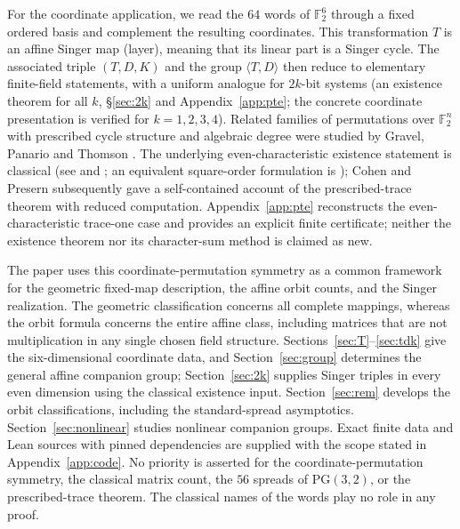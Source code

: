 \documentclass[11pt]{article}
\begin{document}
For the coordinate application, we read the $64$ words of $\mathbb{F}_2^6$
through a fixed ordered basis and complement the resulting coordinates.
This transformation $T$ is an affine Singer map (layer), meaning that its
linear part is a Singer cycle. The
associated triple $(T,D,K)$ and the group $\langle T,D\rangle$ then reduce to
elementary finite-field statements, with a uniform analogue for $2k$-bit systems
(an existence theorem for all $k$, \S\ref{sec:2k} and Appendix~\ref{app:pte}; the concrete coordinate presentation is verified for $k=1,2,3,4$). Related families of
permutations over $\mathbb{F}_2^n$ with prescribed cycle structure and algebraic
degree were studied by Gravel, Panario and Thomson \cite{GPT}. The underlying
even-characteristic existence statement is classical (see \cite{Mor} and
\cite[Theorem~1, p.~1]{Coh90}; an equivalent square-order formulation is \cite[Theorem~1.5, p.~170]{Coh});
Cohen and Presern \cite{CP05} subsequently gave a self-contained account of
the prescribed-trace theorem with reduced computation.
Appendix~\ref{app:pte} reconstructs the even-characteristic trace-one case and
provides an explicit finite certificate; neither the existence theorem nor its
character-sum method is claimed as new.

The paper uses this coordinate-permutation symmetry as a common framework for
the geometric fixed-map description, the affine orbit counts, and the Singer
realization. The geometric classification concerns all complete mappings,
whereas the orbit formula concerns the entire affine class, including matrices
that are not multiplication in any single chosen field structure.
Sections~\ref{sec:T}--\ref{sec:tdk} give the six-dimensional coordinate data,
and Section~\ref{sec:group} determines the general affine companion group; Section~\ref{sec:2k} supplies Singer triples
in every even dimension using the classical existence input.
Section~\ref{sec:rem} develops the orbit classifications, including the standard-spread asymptotics.
Section~\ref{sec:nonlinear} studies nonlinear companion groups. Exact finite data and
Lean sources with pinned dependencies are supplied with the scope stated in
Appendix~\ref{app:code}. No priority is asserted for the coordinate-permutation
symmetry, the classical matrix count, the $56$ spreads of $\mathrm{PG}(3,2)$,
or the prescribed-trace theorem.
The classical names of the words play no role in any proof.
\end{document}
